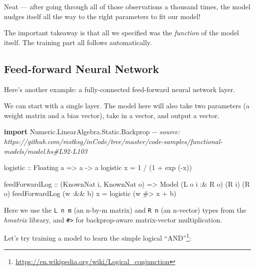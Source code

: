 \documentclass[]{article}
\newenvironment{Shaded}{}{}
\newcommand{\CommentTok}[1]{\textcolor[rgb]{0.38,0.63,0.69}{\textit{#1}}}
\newcommand{\DataTypeTok}[1]{\textcolor[rgb]{0.56,0.13,0.00}{#1}}
\newcommand{\DecValTok}[1]{\textcolor[rgb]{0.25,0.63,0.44}{#1}}
\newcommand{\FunctionTok}[1]{\textcolor[rgb]{0.02,0.16,0.49}{#1}}
\newcommand{\KeywordTok}[1]{\textcolor[rgb]{0.00,0.44,0.13}{\textbf{#1}}}
\newcommand{\NormalTok}[1]{#1}
\newcommand{\OperatorTok}[1]{\textcolor[rgb]{0.40,0.40,0.40}{#1}}
\newcommand{\OtherTok}[1]{\textcolor[rgb]{0.00,0.44,0.13}{#1}}
\renewcommand{\href}[2]{#2\footnote{\url{#1}}}
\begin{document}
Neat --- after going through all of those observations a thousand times, the
model nudges itself all the way to the right parameters to fit our model!

The important takeaway is that all we specified was the \emph{function} of the
model itself. The training part all follows automatically.

\subsection{Feed-forward Neural Network}\label{feed-forward-neural-network}

Here's another example: a fully-connected feed-forward neural network layer.

We can start with a single layer. The model here will also take two parameters
(a weight matrix and a bias vector), take in a vector, and output a vector.

\begin{Shaded}
\begin{Highlighting}[]
\KeywordTok{import} \DataTypeTok{Numeric.LinearAlgebra.Static.Backprop}
\CommentTok{{-}{-} source: https://github.com/mstksg/inCode/tree/master/code{-}samples/functional{-}models/model.hs\#L92{-}L103}

\OtherTok{logistic ::} \DataTypeTok{Floating}\NormalTok{ a }\OtherTok{=\textgreater{}}\NormalTok{ a }\OtherTok{{-}\textgreater{}}\NormalTok{ a}
\NormalTok{logistic x }\OtherTok{=} \DecValTok{1} \OperatorTok{/}\NormalTok{ (}\DecValTok{1} \OperatorTok{+} \FunctionTok{exp}\NormalTok{ (}\OperatorTok{{-}}\NormalTok{x))}

\NormalTok{feedForwardLog}
\OtherTok{    ::}\NormalTok{ (}\DataTypeTok{KnownNat}\NormalTok{ i, }\DataTypeTok{KnownNat}\NormalTok{ o)}
    \OtherTok{=\textgreater{}} \DataTypeTok{Model}\NormalTok{ (}\DataTypeTok{L}\NormalTok{ o i }\OperatorTok{:\&} \DataTypeTok{R}\NormalTok{ o) (}\DataTypeTok{R}\NormalTok{ i) (}\DataTypeTok{R}\NormalTok{ o)}
\NormalTok{feedForwardLog (w }\OperatorTok{:\&\&}\NormalTok{ b) x }\OtherTok{=}\NormalTok{ logistic (w }\OperatorTok{\#\textgreater{}}\NormalTok{ x }\OperatorTok{+}\NormalTok{ b)}
\end{Highlighting}
\end{Shaded}

Here we use the \texttt{L\ n\ m} (an n-by-m matrix) and \texttt{R\ n} (an
n-vector) types from the \emph{hmatrix} library, and \texttt{\#\textgreater{}}
for backprop-aware matrix-vector multiplication.

Let's try training a model to learn the simple
\href{https://en.wikipedia.org/wiki/Logical_conjunction}{logical ``AND''}:
\end{document}
